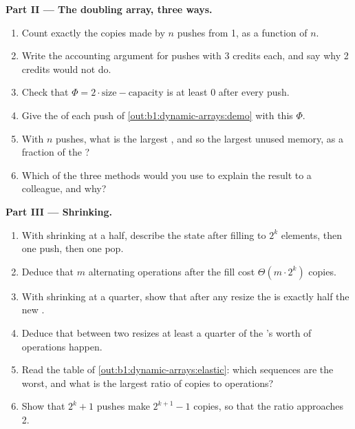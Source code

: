 \begin{problem}
\medskip\noindent\textbf{Part II --- The doubling array, three ways.}
\begin{enumerate}[resume]
\item Count exactly the copies made by $n$ pushes from  1, as a function of $n$.
\item Write the accounting argument for pushes with 3 credits each, and say why 2 credits would not do.
\item Check that $\Phi = 2 \cdot \text{size} - \text{capacity}$ is at least 0 after every push.
\item Give the  of each push of \cref{out:b1:dynamic-arrays:demo} with this $\Phi$.
\item With $n$ pushes, what is the largest , and so the largest unused memory, as a fraction of the ?
\item Which of the three methods would you use to explain the result to a colleague, and why?
\end{enumerate}

\medskip\noindent\textbf{Part III --- Shrinking.}
\begin{enumerate}[resume]
\item With shrinking at a half, describe the state after filling to $2^k$ elements, then one push, then one pop.
\item Deduce that $m$ alternating operations after the fill cost $\Theta(m \cdot 2^k)$ copies.
\item With shrinking at a quarter, show that after any resize the  is exactly half the new .
\item Deduce that between two resizes at least a quarter of the 's worth of operations happen.
\item Read the table of \cref{out:b1:dynamic-arrays:elastic}: which sequences are the worst, and what is the largest
ratio of copies to operations?
\item Show that $2^k + 1$ pushes make $2^{k+1} - 1$ copies, so that the ratio approaches 2.
\end{enumerate}


\end{problem}
